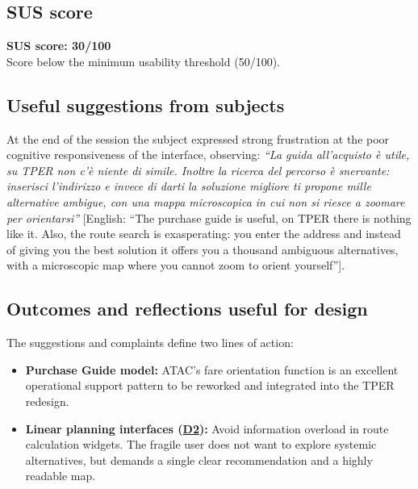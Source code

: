 ﻿\documentclass[11pt,a4paper]{article}
\begin{document}
\subsection*{SUS score}
\begin{tcolorbox}[base]
\textbf{SUS score: 30/100}\\[0.2cm]
\small Score below the minimum usability
threshold (50/100).
\end{tcolorbox}

\subsection*{Useful suggestions from subjects}
\begin{tcolorbox}[base]
At the end of the session the subject expressed strong frustration at the poor cognitive responsiveness of the interface, observing:
\textit{``La guida all'acquisto \`e utile, su TPER non c'\`e niente di simile. Inoltre la ricerca del percorso \`e snervante: inserisci l'indirizzo e invece di darti la soluzione migliore ti propone mille alternative ambigue, con una mappa microscopica in cui non si riesce a zoomare per orientarsi''} [English: ``The purchase guide is useful, on TPER there is nothing like it. Also, the route search is exasperating: you enter the address and instead of giving you the best solution it offers you a thousand ambiguous alternatives, with a microscopic map where you cannot zoom to orient yourself''].

\end{tcolorbox}

\subsection*{Outcomes and reflections useful for design}
\begin{tcolorbox}[base]
\noindent The suggestions and complaints define two lines of action:
\begin{itemize}[leftmargin=*]
    \item \textbf{Purchase Guide model:} ATAC's fare orientation function is an excellent operational support pattern to be reworked and integrated into the TPER redesign.
    \item \textbf{Linear planning interfaces (\hyperref[atac:D2]{D2}):} Avoid information overload in route calculation widgets. The fragile user does not want to explore systemic alternatives, but demands a single clear recommendation and a highly readable map.
\end{itemize}
\end{tcolorbox}
\end{document}
